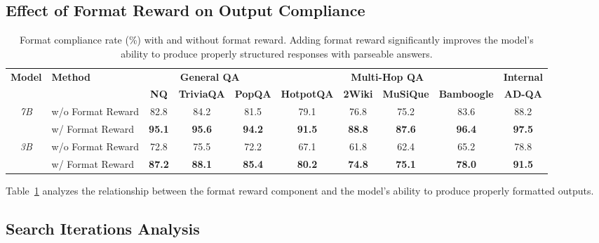 \documentclass[11pt]{article}
\begin{document}
\subsection{Effect of Format Reward on Output Compliance}
\label{sec:appendix_format}

\begin{table}[h]
\centering
\small
\begin{tabular}{cl|ccc|cccc|c}
\toprule
\multirow{2}{*}{\textbf{Model}} & \multirow{2}{*}{\textbf{Method}} & \multicolumn{3}{c|}{\textbf{General QA}} & \multicolumn{4}{c|}{\textbf{Multi-Hop QA}} & \textbf{Internal} \\
& & \textbf{NQ} & \textbf{TriviaQA} & \textbf{PopQA} & \textbf{HotpotQA} & \textbf{2Wiki} & \textbf{MuSiQue} & \textbf{Bamboogle} & \textbf{AD-QA} \\
\midrule
\multirow{2}{*}{\textit{7B}} 
& w/o Format Reward & 82.8 & 84.2 & 81.5 & 79.1 & 76.8 & 75.2 & 83.6 & 88.2 \\
& w/ Format Reward & \textbf{95.1} & \textbf{95.6} & \textbf{94.2} & \textbf{91.5} & \textbf{88.8} & \textbf{87.6} & \textbf{96.4} & \textbf{97.5} \\
\midrule
\multirow{2}{*}{\textit{3B}} 
& w/o Format Reward & 72.8 & 75.5 & 72.2 & 67.1 & 61.8 & 62.4 & 65.2 & 78.8 \\
& w/ Format Reward & \textbf{87.2} & \textbf{88.1} & \textbf{85.4} & \textbf{80.2} & \textbf{74.8} & \textbf{75.1} & \textbf{78.0} & \textbf{91.5} \\
\bottomrule
\end{tabular}
\caption{Format compliance rate (\%) with and without format reward. Adding format reward significantly improves the model's ability to produce properly structured responses with parseable answers.}
\label{tab:format_compliance}
\end{table}

Table~\ref{tab:format_compliance} analyzes the relationship between the format reward component and the model's ability to produce properly formatted outputs.

\subsection{Search Iterations Analysis}
\label{sec:appendix_iterations}
\end{document}
